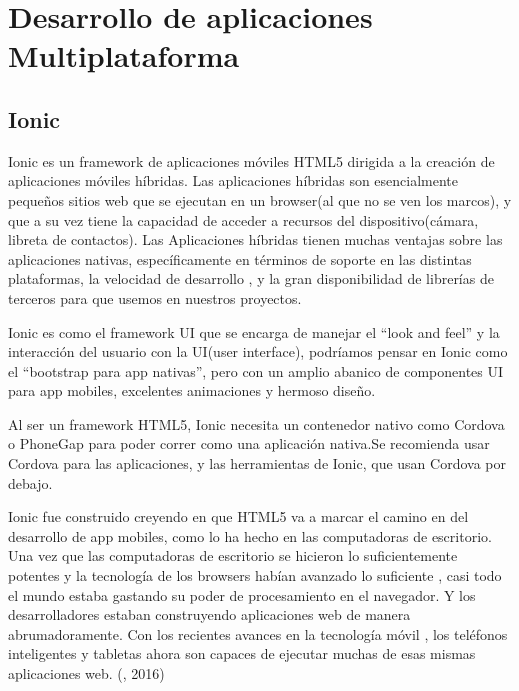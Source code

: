 

\section{Desarrollo de aplicaciones Multiplataforma}

\subsection{Ionic}
\setlength{\parskip}{5mm}
Ionic es un framework de aplicaciones móviles HTML5 dirigida a la creación de aplicaciones móviles híbridas. Las aplicaciones híbridas son esencialmente pequeños sitios web que se ejecutan en un browser(al que no se ven los marcos), y que a su vez tiene la capacidad de acceder a recursos del dispositivo(cámara, libreta de contactos). Las Aplicaciones híbridas tienen muchas ventajas sobre las aplicaciones nativas, específicamente en términos de soporte en las distintas plataformas, la velocidad de desarrollo , y la gran disponibilidad de librerías de terceros para que usemos en nuestros proyectos.

Ionic es como el framework UI que se encarga de manejar el “look and feel” y la interacción del usuario con la UI(user interface), podríamos pensar en Ionic como el “bootstrap para app nativas”, pero con un amplio abanico de componentes UI para app mobiles, excelentes animaciones y hermoso diseño.

Al ser un framework HTML5, Ionic necesita un contenedor nativo como Cordova o PhoneGap para poder correr como una aplicación nativa.Se recomienda usar Cordova para las aplicaciones, y las herramientas de Ionic, que usan Cordova por debajo.

Ionic fue construido creyendo en que HTML5 va a marcar el camino en del desarrollo de app mobiles, como lo ha hecho en las computadoras de escritorio. Una vez que las computadoras de escritorio se hicieron lo suficientemente potentes y la tecnología de los browsers habían avanzado lo suficiente , casi todo el mundo estaba gastando su poder de procesamiento en el navegador. Y los desarrolladores estaban construyendo aplicaciones web de manera abrumadoramente. Con los recientes avances en la tecnología móvil , los teléfonos inteligentes y tabletas ahora son capaces de ejecutar muchas de esas mismas aplicaciones web. (\citet{ionicpbib}, 2016)

\setlength{\parskip}{0mm}

